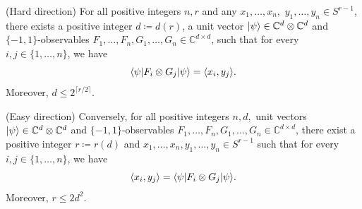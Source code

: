 	\begin{frame}
		\begin{theo}[Tsirelson] \label{theo:Tsirelson}
			(Hard direction) For all positive integers $n, r$ and any $x_1,\dots,x_n,$ $y_1,\dots,y_n\in S^{r-1}$, there exists a positive integer $d\coloneqq d(r)$, a unit vector $\vert {\psi} \rangle\in\mathbb{C}^d\otimes\mathbb{C}^d$ and $\{-1,1\}$-observables $F_1,\dots,F_n,G_1,\dots,G_n\in \mathbb{C}^{d\times d}$, such that for every $i,j\in\{1,\dots,n\}$, we have
			\begin{equation}
				\langle {\psi} \vert F_i\otimes G_j \vert {\psi} \rangle = \langle{x_i},{y_j}\rangle.
			\end{equation}
			Moreover, $d\leq 2^{\lceil r/2 \rceil}$.
			
			(Easy direction) Conversely, for all positive integers $n,d,$ unit vectors $\vert {\psi} \rangle\in \mathbb{C}^d\otimes\mathbb{C}^d$ and $\{-1,1\}$-observables $F_1,\dots,F_n,G_1,\dots,G_n\in \mathbb{C}^{d\times d}$, there exist a positive integer $r\coloneqq r(d)$ and $x_1,\dots,x_n,y_1,\dots,y_n\in S^{r-1}$ such that for every $i,j\in\{1,\dots,n\}$, we have
			\begin{equation}
				\langle{x_i},{y_j}\rangle = \langle {\psi} \vert F_i\otimes G_j \vert {\psi} \rangle.
			\end{equation}
			Moreover, $r\leq 2d^2$.
		\end{theo}
	\end{frame}
